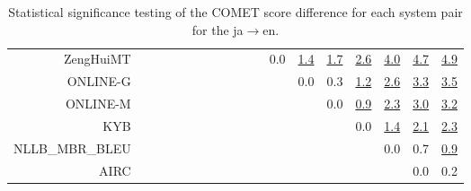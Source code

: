 \documentclass[11pt]{article}
\begin{document}
\begin{sidewaystable}
\begin{center}
{\begin{tabular}{rccccccccccccccccc}
ZengHuiMT &  &  &  &  &  &  &  &  &  &  & \cellcolor{red!0} 0.0 & \cellcolor{red!70} \underline{1.4} & \cellcolor{red!70} \underline{1.7} & \cellcolor{red!70} \underline{2.6} & \cellcolor{red!70} \underline{4.0} & \cellcolor{red!70} \underline{4.7} & \cellcolor{red!70} \underline{4.9}\\ 
ONLINE-G &  &  &  &  &  &  &  &  &  &  &  & \cellcolor{red!0} 0.0 & \cellcolor{red!0} 0.3 & \cellcolor{red!70} \underline{1.2} & \cellcolor{red!70} \underline{2.6} & \cellcolor{red!70} \underline{3.3} & \cellcolor{red!70} \underline{3.5}\\ 
ONLINE-M &  &  &  &  &  &  &  &  &  &  &  &  & \cellcolor{red!0} 0.0 & \cellcolor{red!70} \underline{0.9} & \cellcolor{red!70} \underline{2.3} & \cellcolor{red!70} \underline{3.0} & \cellcolor{red!70} \underline{3.2}\\ 
KYB &  &  &  &  &  &  &  &  &  &  &  &  &  & \cellcolor{red!0} 0.0 & \cellcolor{red!70} \underline{1.4} & \cellcolor{red!70} \underline{2.1} & \cellcolor{red!70} \underline{2.3}\\ 
NLLB\_MBR\_BLEU &  &  &  &  &  &  &  &  &  &  &  &  &  &  & \cellcolor{red!0} 0.0 & \cellcolor{red!60} 0.7 & \cellcolor{red!70} \underline{0.9}\\ 
AIRC &  &  &  &  &  &  &  &  &  &  &  &  &  &  &  & \cellcolor{red!0} 0.0 & \cellcolor{red!0} 0.2\\ 
\bottomrule 
\end{tabular}}
\caption{Statistical significance testing of the COMET score difference for each system pair for the ja$\rightarrow$en.} 
 \end{center} \end{sidewaystable} 
\end{document}
